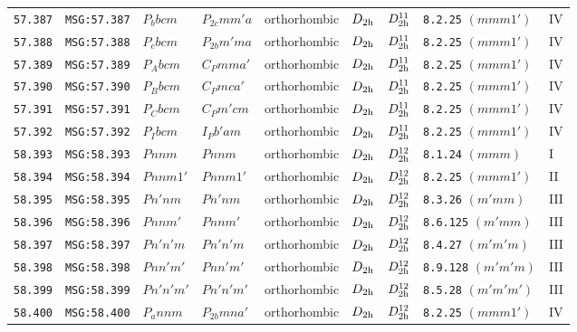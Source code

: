 \documentclass[fleqn,10pt]{jsarticle}
\begin{document}
\begin{center}
\begin{longtable}{lllllllll}
\texttt{57.387} & \texttt{MSG:57.387} & $P_{b}bcm$ & $P_{2c}mm'a$ & orthorhombic & $D_{\rm 2h}$ & $D_{\rm 2h}^{11}$ & \texttt{8.2.25} $(mmm1')$ & IV \\
\texttt{57.388} & \texttt{MSG:57.388} & $P_{c}bcm$ & $P_{2b}m'ma$ & orthorhombic & $D_{\rm 2h}$ & $D_{\rm 2h}^{11}$ & \texttt{8.2.25} $(mmm1')$ & IV \\
\texttt{57.389} & \texttt{MSG:57.389} & $P_{A}bcm$ & $C_{P}mma'$ & orthorhombic & $D_{\rm 2h}$ & $D_{\rm 2h}^{11}$ & \texttt{8.2.25} $(mmm1')$ & IV \\
\texttt{57.390} & \texttt{MSG:57.390} & $P_{B}bcm$ & $C_{P}mca'$ & orthorhombic & $D_{\rm 2h}$ & $D_{\rm 2h}^{11}$ & \texttt{8.2.25} $(mmm1')$ & IV \\
\texttt{57.391} & \texttt{MSG:57.391} & $P_{C}bcm$ & $C_{P}m'cm$ & orthorhombic & $D_{\rm 2h}$ & $D_{\rm 2h}^{11}$ & \texttt{8.2.25} $(mmm1')$ & IV \\
\texttt{57.392} & \texttt{MSG:57.392} & $P_{I}bcm$ & $I_{P}b'am$ & orthorhombic & $D_{\rm 2h}$ & $D_{\rm 2h}^{11}$ & \texttt{8.2.25} $(mmm1')$ & IV \\ \hline
\texttt{58.393} & \texttt{MSG:58.393} & $Pnnm$ & $Pnnm$ & orthorhombic & $D_{\rm 2h}$ & $D_{\rm 2h}^{12}$ & \texttt{8.1.24} $(mmm)$ & I \\
\texttt{58.394} & \texttt{MSG:58.394} & $Pnnm1'$ & $Pnnm1'$ & orthorhombic & $D_{\rm 2h}$ & $D_{\rm 2h}^{12}$ & \texttt{8.2.25} $(mmm1')$ & II \\
\texttt{58.395} & \texttt{MSG:58.395} & $Pn'nm$ & $Pn'nm$ & orthorhombic & $D_{\rm 2h}$ & $D_{\rm 2h}^{12}$ & \texttt{8.3.26} $(m'mm)$ & III \\
\texttt{58.396} & \texttt{MSG:58.396} & $Pnnm'$ & $Pnnm'$ & orthorhombic & $D_{\rm 2h}$ & $D_{\rm 2h}^{12}$ & \texttt{8.6.125} $(m'mm)$ & III \\
\texttt{58.397} & \texttt{MSG:58.397} & $Pn'n'm$ & $Pn'n'm$ & orthorhombic & $D_{\rm 2h}$ & $D_{\rm 2h}^{12}$ & \texttt{8.4.27} $(m'm'm)$ & III \\
\texttt{58.398} & \texttt{MSG:58.398} & $Pnn'm'$ & $Pnn'm'$ & orthorhombic & $D_{\rm 2h}$ & $D_{\rm 2h}^{12}$ & \texttt{8.9.128} $(m'm'm)$ & III \\
\texttt{58.399} & \texttt{MSG:58.399} & $Pn'n'm'$ & $Pn'n'm'$ & orthorhombic & $D_{\rm 2h}$ & $D_{\rm 2h}^{12}$ & \texttt{8.5.28} $(m'm'm')$ & III \\
\texttt{58.400} & \texttt{MSG:58.400} & $P_{a}nnm$ & $P_{2b}mna'$ & orthorhombic & $D_{\rm 2h}$ & $D_{\rm 2h}^{12}$ & \texttt{8.2.25} $(mmm1')$ & IV \\

\end{longtable}
\end{center}
\end{document}
